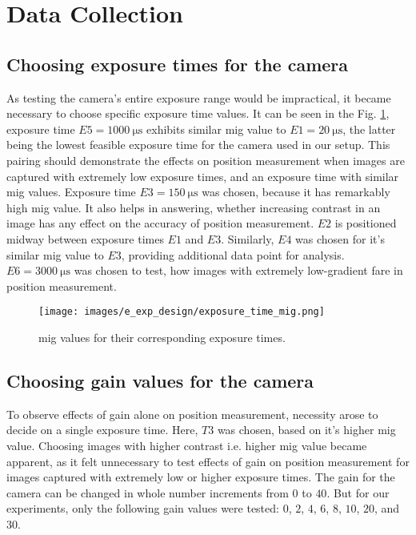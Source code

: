 \section{Data Collection}\label{section:data_collection}
\subsection*{Choosing exposure times for the camera}
As testing the camera's entire exposure range would be impractical, it became necessary to choose specific exposure time values. It can be seen in the Fig. \ref{fig:exposure_time_mig.png}, exposure time $E5=\SI{1000}{\micro\second}$ exhibits similar \gls{mig} value to $E1=\SI{20}{\micro\second}$, the latter being the lowest feasible exposure time for the camera used in our setup. This pairing should demonstrate the effects on position measurement when images are captured with extremely low exposure times, and an exposure time with similar \gls{mig} values. Exposure time $E3=\SI{150}{\micro\second}$ was chosen, because it has remarkably high \gls{mig} value. It also helps in answering, whether increasing contrast in an image has any effect on the accuracy of position measurement. $E2$ is positioned midway between exposure times $E1$ and $E3$. Similarly, $E4$ was chosen for it's similar \gls{mig} value to $E3$, providing additional data point for analysis. $E6=\SI{3000}{\micro\second}$ was chosen to test, how images with extremely low-gradient fare in position measurement.

\begin{figure}[h]
    \centering
    \texttt{[image: images/e\_exp\_design/exposure\_time\_mig.png]}
    \caption{\gls{mig} values for their corresponding exposure times.}
    \label{fig:exposure_time_mig.png}
\end{figure}

\subsection*{Choosing gain values for the camera}
To observe effects of gain alone on position measurement, necessity arose to decide on a single exposure time. Here, $T3$ was chosen, based on it's higher \gls{mig} value. Choosing images with higher contrast i.e. higher \gls{mig} value became apparent, as it felt unnecessary to test effects of gain on position measurement for images captured with extremely low or higher exposure times. The gain for the camera can be changed in whole number increments from $0$ to $40$. But for our experiments, only the following gain values were tested: $0$, $2$, $4$, $6$, $8$, $10$, $20$, and $30$. 

